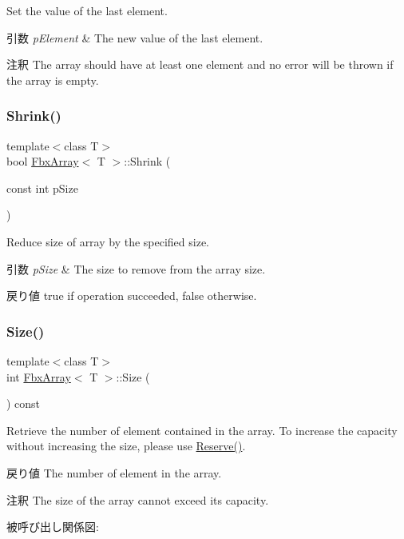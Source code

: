 Set the value of the last element. 
\begin{DoxyParams}{引数}
{\em p\+Element} & The new value of the last element. \\
\hline
\end{DoxyParams}
\begin{DoxyRemark}{注釈}
The array should have at least one element and no error will be thrown if the array is empty. 
\end{DoxyRemark}
\mbox{\label{class_fbx_array_a252df10a0b24e15b515be15dcbfb6e0a}} 
\subsubsection{\texorpdfstring{Shrink()}{Shrink()}}
{\footnotesize\ttfamily template$<$class T$>$ \\
bool \hyperlink{class_fbx_array}{Fbx\+Array}$<$ T $>$\+::Shrink (\begin{DoxyParamCaption}\item[{const int}]{p\+Size }\end{DoxyParamCaption})}

Reduce size of array by the specified size. 
\begin{DoxyParams}{引数}
{\em p\+Size} & The size to remove from the array size. \\
\hline
\end{DoxyParams}
\begin{DoxyReturn}{戻り値}
{\ttfamily true} if operation succeeded, {\ttfamily false} otherwise. 
\end{DoxyReturn}
\mbox{\label{class_fbx_array_aa76a0ceaf4b13a2acec7c0cdd1c08362}} 
\subsubsection{\texorpdfstring{Size()}{Size()}}
{\footnotesize\ttfamily template$<$class T$>$ \\
int \hyperlink{class_fbx_array}{Fbx\+Array}$<$ T $>$\+::Size (\begin{DoxyParamCaption}{ }\end{DoxyParamCaption}) const}

Retrieve the number of element contained in the array. To increase the capacity without increasing the size, please use \hyperlink{class_fbx_array_a7d5a64be591ee59708079c2c5fe0dd1b}{Reserve()}. \begin{DoxyReturn}{戻り値}
The number of element in the array. 
\end{DoxyReturn}
\begin{DoxyRemark}{注釈}
The size of the array cannot exceed its capacity. 
\end{DoxyRemark}
被呼び出し関係図\+:
\mbox{\label{class_fbx_array_ab4bd11584ad0175022c04d817366ecba}} 
